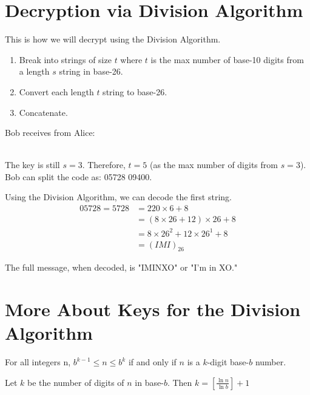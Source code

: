 \section{Decryption via Division Algorithm}
This is how we will decrypt using the Division Algorithm.

\begin{enumerate}
\item Break into strings of size $t$ where $t$ is the max number of base-10 digits from a length $s$ string in base-26.
\item Convert each length $t$ string to base-26.
\item Concatenate.
\end{enumerate}


\begin{example}

Bob receives from Alice: 

{\\}
The key is still $s=3$. Therefore, $t=5$ (as the max number of digits from $s=3$).
Bob can split the code as: 05728 09400.

Using the Division Algorithm, we can decode the first string.
\begin{equation} \label{eq1}
\begin{split}
05728 = 5728 & = 220 \times 6 + 8\\
 & = (8 \times 26 + 12) \times 26 + 8\\
  & = 8 \times 26^{2} + 12 \times 26^{1} + 8\\
  & = (I M I)_{26}
\end{split}
\end{equation}

The full message, when decoded, is "IMINXO" or "I'm in XO."


\end{example}

\section{More About Keys for the Division Algorithm}

\begin{theorem}
For all integers n, $b^{k-1} \leq n \le b^{k}$ if and only if $n$ is a $k$-digit base-$b$ number.
\end{theorem}
\begin{corollary}\label{cor:ExampleCor} Let $k$ be the number of digits of $n$ in base-$b$. Then $k = [\frac{\ln {n}}{\ln {b}}] + 1$ \end{corollary}

